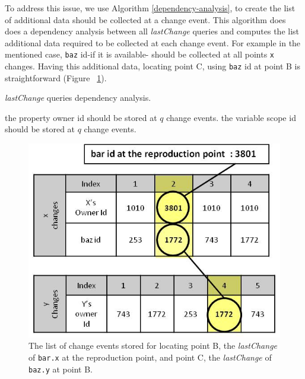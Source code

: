 \documentclass[preprint]{sigplanconf}
\begin{document}
To address this issue, we use Algorithm \ref{dependency-analysis}, to create the list of additional data should be collected at a change event. This algorithm does does a dependency analysis between all \textit{lastChange} queries and computes the list additional data required to be collected at each change event. For example in the mentioned case, \texttt{baz} id-if it is available- should be collected at all points \texttt{x} changes. Having this additional data, locating point C, using \texttt{baz} id at point B is straightforward (Figure ~\ref{fig:lastchange-lastchange}).

\begin{algorithm}
\caption{\textit{lastChange} queries dependency analysis.}
\label{dependency-analysis}
\begin{algorithmic}

     \STATE the property owner id should be stored at $q$ change events. 
     \STATE the variable scope id should be stored at $q$ change events.
	 \ENDIF 
 \ENDFOR 
\ENDFOR

\end{algorithmic}
\end{algorithm}

\begin{figure}[htp]
\includegraphics[width=.48\textwidth]{8-lastchange-lastchange.jpg}
\caption{The list of change events stored for locating point B, the \textit{lastChange} of \texttt{bar.x} at the reproduction point, and point C, the \textit{lastChange} of  \texttt{baz.y} at point B.}
\label{fig:lastchange-lastchange}
\end{figure}




\end{document}
